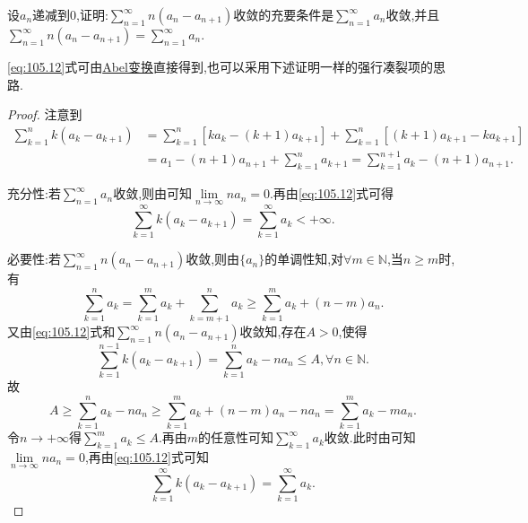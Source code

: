 \documentclass[../../main.tex]{subfiles}%
\begin{document}
\begin{proposition}\label{proposition:级数经典命题1}
设$a_n$递减到$0$,证明:$\sum\limits_{n=1}^\infty n\left(a_n-a_{n+1}\right)$收敛的充要条件是$\sum\limits_{n=1}^\infty a_n$收敛,并且$\sum\limits_{n=1}^\infty n\left(a_n-a_{n+1}\right)=\sum\limits_{n=1}^\infty a_n$.
\end{proposition}
\begin{note}
\eqref{eq:105.12}式可由\hyperref[theorem:Abel变换]{Abel变换}直接得到,也可以采用下述证明一样的强行凑裂项的思路.
\end{note}
\begin{proof}

注意到
\begin{align}
\sum_{k=1}^n{k\left( a_k-a_{k+1} \right)}&=\sum_{k=1}^n{\left[ ka_k-\left( k+1 \right) a_{k+1} \right]}+\sum_{k=1}^n{\left[ \left( k+1 \right) a_{k+1}-ka_{k+1} \right]} \nonumber \\
&=a_1-\left( n+1 \right) a_{n+1}+\sum_{k=1}^n{a_{k+1}}=\sum_{k=1}^{n+1}{a_k}-\left( n+1 \right) a_{n+1}. \label{eq:105.12}
\end{align}

{\heiti 充分性:}若$\sum_{n=1}^{\infty}{a_n}$收敛,则由可知$\lim\limits_{n\rightarrow \infty}na_n=0$.再由\eqref{eq:105.12}式可得
$$\sum_{k=1}^{\infty}{k\left( a_k-a_{k+1} \right)}=\sum_{k=1}^{\infty}{a_k}<+\infty .$$

{\heiti 必要性:}若$\sum_{n=1}^{\infty}{n\left( a_n-a_{n+1} \right)}$收敛,则由$\{ a_n \}$的单调性知,对$\forall m\in \mathbb{N}$,当$n\geqslant m$时,有
$$\sum_{k=1}^n{a_k}=\sum_{k=1}^m{a_k}+\sum_{k=m+1}^n{a_k}\geqslant \sum_{k=1}^m{a_k}+\left( n-m \right) a_n.$$
又由\eqref{eq:105.12}式和$\sum_{n=1}^{\infty}{n\left( a_n-a_{n+1} \right)}$收敛知,存在$A>0$,使得
$$\sum_{k=1}^{n-1}{k\left( a_k-a_{k+1} \right)}=\sum_{k=1}^n{a_k}-na_n\leqslant A,\forall n\in \mathbb{N} .$$
故
$$A\geqslant \sum_{k=1}^n{a_k}-na_n\geqslant \sum_{k=1}^m{a_k}+\left( n-m \right) a_n-na_n=\sum_{k=1}^m{a_k}-ma_n.$$
令$n\rightarrow +\infty$得$\sum_{k=1}^m{a_k}\leqslant A$.再由$m$的任意性可知$\sum_{k=1}^{\infty}{a_k}$收敛.此时由可知$\lim\limits_{n\rightarrow \infty}na_n=0$,再由\eqref{eq:105.12}式可知
$$\sum_{k=1}^{\infty}{k\left( a_k-a_{k+1} \right)}=\sum_{k=1}^{\infty}{a_k}.$$
\end{proof}
\end{document}
